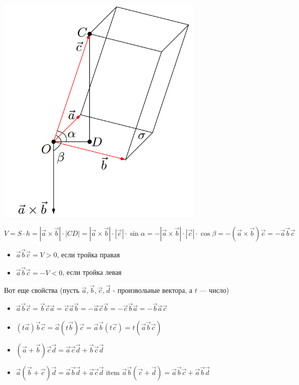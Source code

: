 \documentclass[a4paper]{article}
\begin{document}
\begin{hproof}
        \includegraphics[width=10cm]{t5}

        \begin{equation}
            V = S \cdot h = | \vec{a} \times \vec{b} | \cdot | CD | = | \vec{a} \times \vec{b} | \cdot | \vec{c} | \cdot \sin \alpha = - | \vec{a} \times \vec{b} | \cdot | \vec{c} | \cdot \cos \beta = - (\vec{a} \times \vec{b}) \vec{c} = -\vec{a} \vec{b} \vec{c}
        \end{equation}

        \begin{itemize}
            \item $\vec{a} \vec{b} \vec{c} = V > 0$, если тройка правая
            \item $\vec{a} \vec{b} \vec{c} = -V < 0$, если тройка левая
        \end{itemize}

    \end{hproof}


    Вот еще свойства (пусть $\vec{a}, \vec{b}, \vec{c}, \vec{d}$ - произвольные вектора, а $t$ --- число)
    \begin{itemize}
        \item $\vec{a} \vec{b} \vec{c} = \vec{b} \vec{c} \vec{a} = \vec{c} \vec{a} \vec{b} = -\vec{a} \vec{c} \vec{b} = -\vec{c} \vec{b} \vec{a} = -\vec{b} \vec{a} \vec{c}$
        \item $(t\vec{a}) \vec{b} \vec{c} = \vec{a} (t \vec{b}) \vec{c} = \vec{a} \vec{b} (t \vec{c}) = t (\vec{a} \vec{b} \vec{c})$
        \item $(\vec{a} + \vec{b}) \vec{c} \vec{d} = \vec{a} \vec{c} \vec{d} + \vec{b} \vec{c} \vec{d} $
        \item $\vec{a} (\vec{b} + \vec{c}) \vec{d} = \vec{a} \vec{b} \vec{d} + \vec{a} \vec{c} \vec{d}$
        item $\vec{a} \vec{b} (\vec{c} + \vec{d}) = \vec{a} \vec{b} \vec{c} + \vec{a} \vec{b} \vec{d}$
    \end{itemize}
\end{document}
